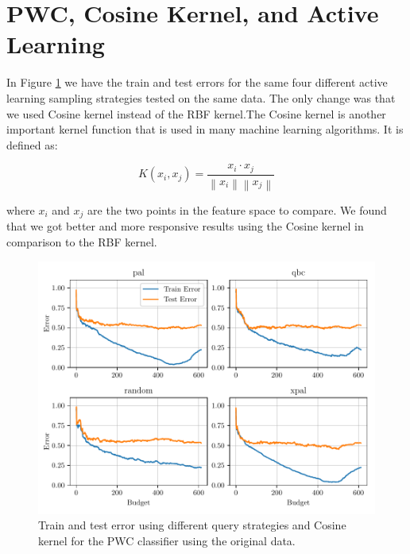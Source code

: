 
\section{PWC, Cosine Kernel, and Active Learning}

In Figure \ref{fig:plot_all_results_cosine} we have the train and test errors for the same four different active learning sampling strategies tested on the same data. The only change was that we used Cosine kernel instead of the RBF kernel.The Cosine kernel is another important kernel function that is used in many machine learning algorithms. It is defined as:

\begin{equation}
    K(x_i, x_j) = \frac{x_i \cdot x_j}{\left\| x_i \right\| \left\| x_j \right\|}
\label{eq:cosine_kernel}
\end{equation}

where $x_i$ and $x_j$ are the two points in the feature space to compare. We found that we got better and more responsive results using the Cosine kernel in comparison to the RBF kernel.  

\begin{figure}[ht]
  \centering
  \includegraphics[width=\scale\textwidth]{../img/plot_all_results_cosine_original_data.pdf}
  \caption{Train and test error using different query strategies and Cosine kernel for the PWC classifier using the original data.}
  \label{fig:plot_all_results_cosine}
\end{figure}


